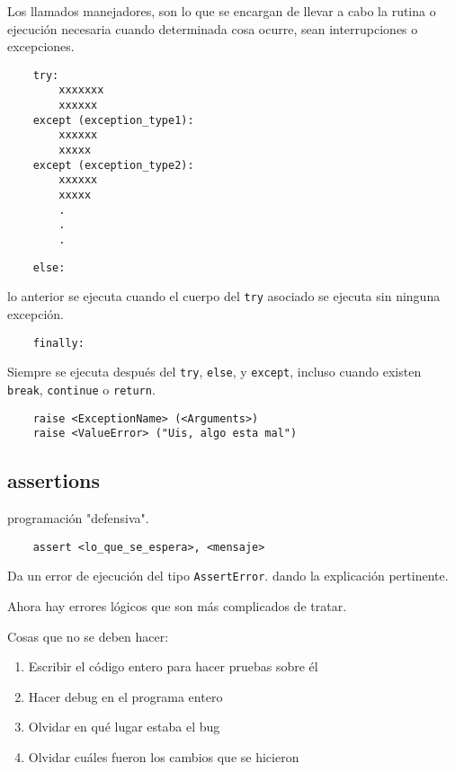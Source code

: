 Los llamados manejadores, son lo que se encargan de llevar a cabo la rutina o ejecución necesaria cuando determinada cosa ocurre, sean interrupciones o excepciones.

\begin{verbatim}
    try:
        xxxxxxx
        xxxxxx
    except (exception_type1):
        xxxxxx
        xxxxx
    except (exception_type2):
        xxxxxx
        xxxxx
        .
        .
        .
\end{verbatim}


\begin{verbatim}
    else:
\end{verbatim}

lo anterior se ejecuta cuando el cuerpo del \texttt{try} asociado se ejecuta sin ninguna excepción.

\begin{verbatim}
    finally:
\end{verbatim}

Siempre se ejecuta después del \texttt{try}, \texttt{else}, y \texttt{except}, incluso cuando existen \texttt{break}, \texttt{continue} o \texttt{return}.

\begin{verbatim}
    raise <ExceptionName> (<Arguments>)
    raise <ValueError> ("Uis, algo esta mal")
\end{verbatim}

\subsection{assertions}

programación "defensiva". 

\begin{verbatim}
    assert <lo_que_se_espera>, <mensaje>
\end{verbatim}

Da un error de ejecución del tipo \texttt{AssertError}. dando la explicación pertinente.

Ahora hay errores lógicos que son más complicados de tratar. 

Cosas que no se deben hacer:

\begin{enumerate}
    \item Escribir el código entero para hacer pruebas sobre él
    \item Hacer debug en el programa entero
    \item Olvidar en qué lugar estaba el bug
    \item Olvidar cuáles fueron los cambios que se hicieron
\end{enumerate}

